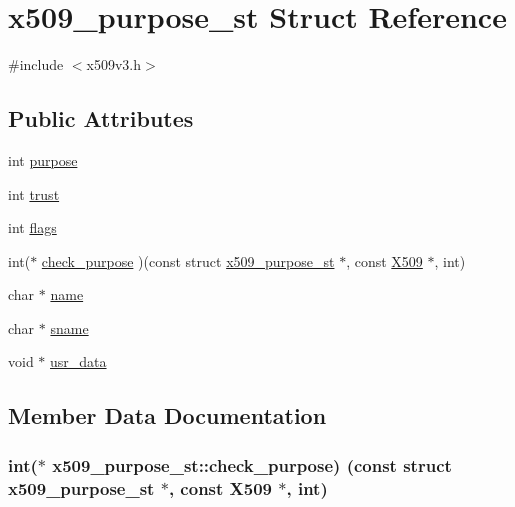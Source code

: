 \hypertarget{structx509__purpose__st}{}\section{x509\+\_\+purpose\+\_\+st Struct Reference}
\label{structx509__purpose__st}


{\ttfamily \#include $<$x509v3.\+h$>$}

\subsection*{Public Attributes}
\begin{DoxyCompactItemize}
\item 
int \hyperlink{structx509__purpose__st_ad1f43f5b4f7cd5114e7c987b5d485a42}{purpose}
\item 
int \hyperlink{structx509__purpose__st_a2033355e7111f867d6727e2da3e92716}{trust}
\item 
int \hyperlink{structx509__purpose__st_ad058e4594818ca6291ac4a69586c302b}{flags}
\item 
int($\ast$ \hyperlink{structx509__purpose__st_ab424957e81af589729dc0166335c8977}{check\+\_\+purpose} )(const struct \hyperlink{structx509__purpose__st}{x509\+\_\+purpose\+\_\+st} $\ast$, const \hyperlink{ossl__typ_8h_a4f666bde6518f95deb3050c54b408416}{X509} $\ast$, int)
\item 
char $\ast$ \hyperlink{structx509__purpose__st_a736be2bbe6bd7c8def80d9c42efb918f}{name}
\item 
char $\ast$ \hyperlink{structx509__purpose__st_ada906ff4bac6b5b675a7e325e7424bc5}{sname}
\item 
void $\ast$ \hyperlink{structx509__purpose__st_a50555ed3f80ed1a0bfed457c7649c600}{usr\+\_\+data}
\end{DoxyCompactItemize}


\subsection{Member Data Documentation}
\subsubsection[{\texorpdfstring{check\+\_\+purpose}{check_purpose}}]{\setlength{\rightskip}{0pt plus 5cm}int($\ast$ x509\+\_\+purpose\+\_\+st\+::check\+\_\+purpose) (const struct {\bf x509\+\_\+purpose\+\_\+st} $\ast$, const {\bf X509} $\ast$, int)}\hypertarget{structx509__purpose__st_ab424957e81af589729dc0166335c8977}{}\label{structx509__purpose__st_ab424957e81af589729dc0166335c8977}
